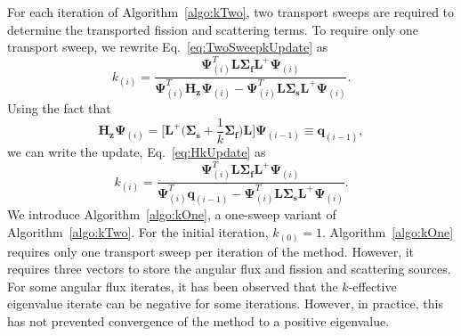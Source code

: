 For each iteration of Algorithm~\ref{algo:kTwo}, two transport sweeps are required to determine the transported fission and scattering terms. To require only one transport sweep, we rewrite Eq.~\ref{eq:TwoSweepkUpdate} as
\begin{equation}
	k_{(i)} = \frac{\mathbf{\Psi}^{T}_{(i)} \mathbf{L} \mathbf{\Sigma_{f}} \mathbf{L}^{+} \mathbf{\Psi}_{(i)}}{\mathbf{\Psi}^{T}_{(i)}\mathbf{H}_{\mathbf{z}} \mathbf{\Psi}_{(i)} - \mathbf{\Psi}^{T}_{(i)} \mathbf{L} \mathbf{\Sigma_{s}} \mathbf{L}^{+} \mathbf{\Psi}_{(i)}}.
	\label{eq:HkUpdate}
\end{equation}
Using the fact that
\begin{equation}
\mathbf{H_{z}} \mathbf{\Psi}_{(i)} =  \bigg [ \mathbf{L}^{+} \bigg ( \mathbf{\Sigma_{s}} + \frac{1}{k}\mathbf{\Sigma_{f}} \bigg ) \mathbf{L} \bigg ] \mathbf{\Psi}_{(i-1)} \equiv \mathbf{q}_{(i-1)},
\end{equation}
we can write the update, Eq.~\ref{eq:HkUpdate} as
\begin{equation}
	k_{(i)} = \frac{\mathbf{\Psi}^{T}_{(i)} \mathbf{L} \mathbf{\Sigma_{f}} \mathbf{L}^{+} \mathbf{\Psi}_{(i)}}{\mathbf{\Psi}^{T}_{(i)}\mathbf{q}_{(i-1)} - \mathbf{\Psi}^{T}_{(i)} \mathbf{L} \mathbf{\Sigma_{s}} \mathbf{L}^{+} \mathbf{\Psi}_{(i)}}.
\end{equation}
We introduce Algorithm~\ref{algo:kOne}, a one-sweep variant of Algorithm~\ref{algo:kTwo}. For the initial iteration, $k_{(0)} = 1$. Algorithm~\ref{algo:kOne} requires only one transport sweep per iteration of the method. However, it requires three vectors to store the angular flux and fission and scattering sources. For some angular flux iterates, it has been observed that the $k$-effective eigenvalue iterate can be negative for some iterations. However, in practice, this has not prevented convergence of the method to a positive eigenvalue.
